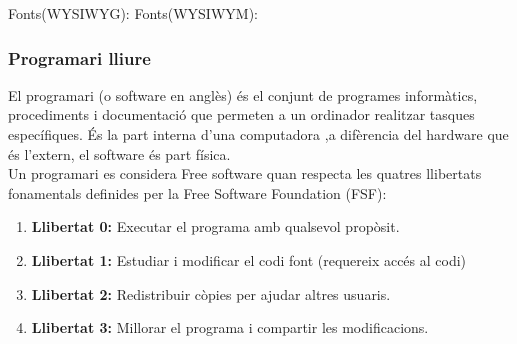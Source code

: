 Fonts(WYSIWYG): \cite{WikipediaWYSIWYG} \cite{Wix(WYSWYG)}
Fonts(WYSIWYM): \cite{Wikipedia(WYSWYM)} \cite{wiki:xxx}

\subsubsection{Programari lliure}\label{subsec:programari lliure}

El programari (o software en anglès) és el conjunt de programes informàtics, procediments i documentació que permeten a un ordinador realitzar tasques específiques. És la part interna d'una computadora ,a difèrencia del hardware que és l'extern, el software és part física.\\

Un programari es considera Free software quan respecta les quatres llibertats fonamentals definides per la Free Software Foundation (FSF):
\begin{enumerate}
 \item  \textbf{Llibertat 0:} Executar el programa amb qualsevol propòsit.
 \item  \textbf{Llibertat 1:} Estudiar i modificar el codi font (requereix accés al codi)
 \item  \textbf{Llibertat 2:} Redistribuir còpies per ajudar altres usuaris.
 \item  \textbf{Llibertat 3:} Millorar el programa i compartir les modificacions.
\end{enumerate}

